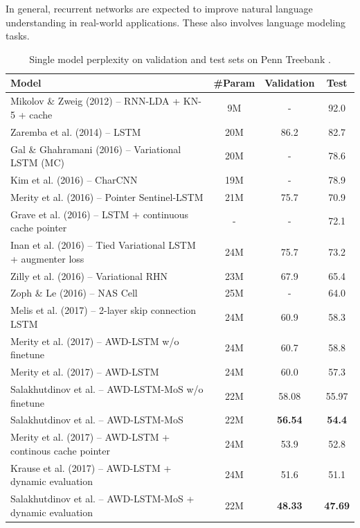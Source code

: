 \documentclass{IEEEtran}
\begin{document}
In general, recurrent networks are expected to improve natural language understanding in real-world applications. These also involves language modeling tasks.

\begin{table}[!t]
\caption{Single model perplexity on validation and test sets on Penn Treebank \cite{Salakhutdinov2017Softmax}.}
\label{tab:softmax}
\centering
\begin{tabular}{ l|c c c }
\toprule
\textbf{Model} & \textbf{#Param} & \textbf{Validation} & \textbf{Test} \\
\hline
Mikolov \& Zweig (2012) -- RNN-LDA + KN-5 + cache & 9M & - & 92.0 \\
Zaremba et al. (2014) -- LSTM & 20M & 86.2 & 82.7 \\
Gal \& Ghahramani (2016) -- Variational LSTM (MC) & 20M & - & 78.6 \\
Kim et al. (2016) -- CharCNN & 19M & - & 78.9 \\
Merity et al. (2016) -- Pointer Sentinel-LSTM & 21M & 75.7 & 70.9 \\
Grave et al. (2016) -- LSTM + continuous cache pointer & - & - & 72.1 \\
Inan et al. (2016) -- Tied Variational LSTM + augmenter loss & 24M & 75.7 & 73.2 \\
Zilly et al. (2016) -- Variational RHN & 23M & 67.9 & 65.4 \\
Zoph \& Le (2016) -- NAS Cell & 25M & - & 64.0 \\
Melis et al. (2017) -- 2-layer skip connection LSTM & 24M & 60.9 & 58.3 \\
\hline
Merity et al. (2017) -- AWD-LSTM w/o finetune & 24M & 60.7 & 58.8 \\
Merity et al. (2017) -- AWD-LSTM & 24M & 60.0 & 57.3 \\
Salakhutdinov et al. \cite{Salakhutdinov2017Softmax} -- AWD-LSTM-MoS w/o finetune & 22M & 58.08 & 55.97 \\
Salakhutdinov et al. \cite{Salakhutdinov2017Softmax} -- AWD-LSTM-MoS & 22M & \textbf{56.54} & \textbf{54.4} \\
\hline
Merity et al. (2017) -- AWD-LSTM + continous cache pointer & 24M & 53.9 & 52.8 \\
Krause et al. (2017) -- AWD-LSTM + dynamic evaluation & 24M & 51.6 & 51.1 \\
Salakhutdinov et al. \cite{Salakhutdinov2017Softmax} -- AWD-LSTM-MoS + dynamic evaluation & 22M & \textbf{48.33} & \textbf{47.69} \\
\bottomrule
\end{tabular}
\end{table}
\end{document}
